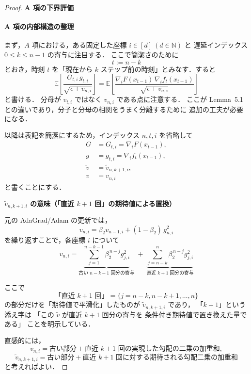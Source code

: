 \documentclass[dvipdfmx,a4paper,11pt]{jsarticle}
\begin{document}
\begin{proof}
\newpage
\noindent
\textbf{A 項の下界評価}

\noindent
\paragraph{A 項の内部構造の整理}

まず，$A$ 項における，ある固定した座標 $i \in [d]\ (d \in \mathbb{N})$ と
遅延インデックス $0 \le k \le n-1$ の寄与に注目する．
ここで簡潔さのために
\[
  t := n-k
\]
とおき，時刻 $t$ を「現在から $k$ ステップ前の時刻」とみなす．すると
\begin{equation}
    \mathbb{E}\!\left[\frac{G_{t,i}\, g_{t,i}}{\sqrt{\epsilon + v_{n,i}}}\right]
    = \mathbb{E}\!\left[
        \frac{\nabla_i F(x_{t-1})\, \nabla_i f_{t}(x_{t-1})}{\sqrt{\epsilon + v_{n,i}}}
      \right]
    \tag{A.19}
    \label{eq:Aterm_t}
\end{equation}
と書ける．
分母が $v_{t,i}$ ではなく $v_{n,i}$ である点に注意する．
ここが Lemma~5.1 との違いであり，分子と分母の相関をうまく分離するために
追加の工夫が必要になる．

以降は表記を簡潔にするため，インデックス $n,t,i$ を省略して
\begin{align*}
    G &= G_{t,i} = \nabla_i F(x_{t-1}), \\
    g &= g_{t,i} = \nabla_i f_{t}(x_{t-1}), \\
    \tilde{v} &= \tilde{v}_{n,k+1,i}, \\
    v &= v_{n,i}
\end{align*}
と書くことにする．

\medskip
\noindent
\textbf{$\tilde{v}_{n,k+1,i}$ の意味（「直近 $k+1$ 回」の期待値による置換）}

元の AdaGrad/Adam の更新では，
\[
  v_{n,i}
  = \beta_2 v_{n-1,i} + (1-\beta_2)\,g_{n,i}^2
\]
を繰り返すことで，各座標 $i$ について
\[
  v_{n,i}
  = \underbrace{\sum_{j=1}^{n-k-1} \beta_2^{\,n-j} g_{j,i}^2}_{\text{古い $n-k-1$ 回分の寄与}}
    \;+\;
    \underbrace{\sum_{j=n-k}^{n} \beta_2^{\,n-j} g_{j,i}^2}_{\text{直近 $k+1$ 回分の寄与}}
\]

ここで
\[
  \text{「直近 $k+1$ 回」} = \{j = n-k, n-k+1, \ldots, n\}
\]
の部分だけを「期待値で平滑化」したものが
\(\tilde{v}_{n,k+1,i}\) であり，
「$k+1$」という添え字は
「この $\tilde{v}$ が直近 $k+1$ 回分の寄与を
  条件付き期待値で置き換えた量である」
ことを明示している．

直感的には，
\[
  v_{n,i}
  = \text{古い部分} + \text{直近 $k+1$ 回の実現した勾配の二乗の加重和},
\]
\[
  \tilde{v}_{n,k+1,i}
  = \text{古い部分} + \text{直近 $k+1$ 回に対する期待される勾配二乗の加重和}
\]
と考えればよい．


\end{proof}
\end{document}
